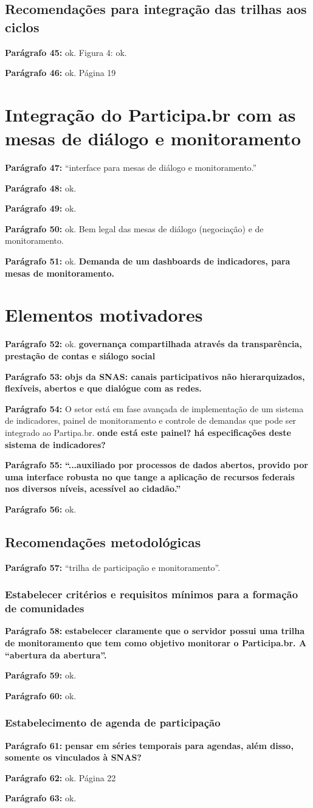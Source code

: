 \documentclass[12pt]{report}
\newcommand{\pp}[1]{

\textbf{Parágrafo #1:}
}
\begin{document}
\subsection{Recomendações para integração das trilhas aos ciclos}
\pp{45} ok.
Figura 4: ok.
\pp{46} ok.
\noindent Página 19
\section{Integração do Participa.br com as mesas de diálogo e monitoramento}
\pp{47} ``interface para mesas de diálogo e monitoramento.''
\pp{48} ok.
\pp{49} ok.
\pp{50} ok. Bem legal das mesas de diálogo (negociação) e de monitoramento.
\pp{51} ok. {\bf \color{red} Demanda de um dashboards de indicadores, para mesas de monitoramento.}
\section{Elementos motivadores}
\pp{52} ok. {\bf \color{red} governança compartilhada através da transparência, prestação de contas e siálogo social}
\pp{53} {\bf \color{red} objs da SNAS: canais participativos não hierarquizados, flexíveis, abertos e que dialógue com as redes.}
\pp{54} O setor está em fase avançada de implementação de um sistema de indicadores, painel de monitoramento e controle de demandas que pode ser integrado ao Partipa.br. {\bf \color{red} onde está este painel? há especificações deste sistema de indicadores?}
\pp{55} {\bf \color{red} ``...auxiliado por processos de dados abertos, provido por uma interface robusta no que tange a aplicação de recursos federais nos diversos níveis, acessível ao cidadão.''}
\pp{56} ok.
\subsection{Recomendações metodológicas}
\pp{57} ``trilha de participação e monitoramento''.
\subsubsection{Estabelecer critérios e requisitos mínimos para a formação de comunidades}
\pp{58} {\bf \color{red} estabelecer claramente que o servidor possui uma trilha de monitoramento que tem como objetivo monitorar o Participa.br. A ``abertura da abertura''.}
\pp{59} ok.
\pp{60} ok.
\subsubsection{Estabelecimento de agenda de participação}
\pp{61} {\bf \color{red} pensar em séries temporais para agendas, além disso, somente os vinculados à SNAS?}
\pp{62} ok.
\noindent Página 22
\pp{63} ok.
\end{document}
